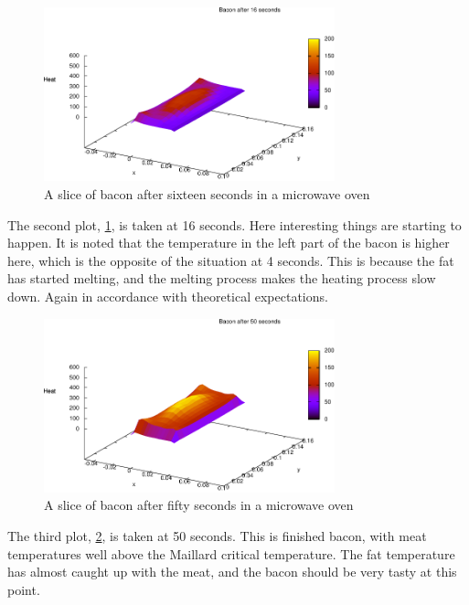 \begin{figure}[!h]
  \begin{center}
    \includegraphics[width=0.75\textwidth]{bacon-16sec.pdf}
  \end{center}
  \caption{A slice of bacon after sixteen seconds in a microwave oven}
  \label{fig:bacon-16sec}
\end{figure}

The second plot, \cref{fig:bacon-16sec}, is taken at 16 seconds. Here
interesting things are starting to happen. It is noted that the temperature in the
left part of the bacon is higher here, which is the opposite of the situation
at 4 seconds. This is because the fat has started melting, and the melting
process makes the heating process slow down. Again in accordance with
theoretical expectations. \\

\begin{figure}[!h]
  \begin{center}
    \includegraphics[width=0.75\textwidth]{bacon-50sec.pdf}
  \end{center}
  \caption{A slice of bacon after fifty seconds in a microwave oven}
  \label{fig:bacon-50sec}
\end{figure}

The third plot, \cref{fig:bacon-50sec}, is taken at 50 seconds. This is finished
bacon, with meat temperatures well above the Maillard critical temperature. The
fat temperature has almost caught up with the meat, and the bacon should be very
tasty at this point.


